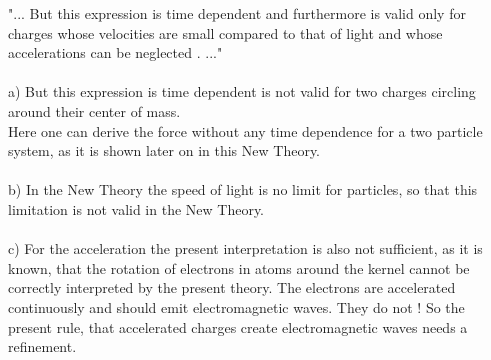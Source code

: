\documentclass[10pt,titlepage]{article}
\begin{document}
"... But this expression is time dependent and furthermore is valid only for charges whose velocities are small compared to that of light and whose accelerations can be neglected .  ..."
\\\\
a) But this expression is time dependent is not valid for two charges circling around their center of mass.
\\ Here one can derive the force without any time dependence for a two particle system, as it is shown later on in this New Theory.
\\\\
b) In the New Theory the speed of light is no limit for particles, so that this limitation is not valid in the New Theory. 
\\
\\
c) For the acceleration the present interpretation is also not sufficient, as it is known, that the rotation of electrons in atoms around the kernel cannot be correctly interpreted by the present theory. The electrons are accelerated continuously and should emit electromagnetic waves. They do not ! So the present rule, that accelerated charges create electromagnetic waves needs a refinement. 
\\

\end{document}
